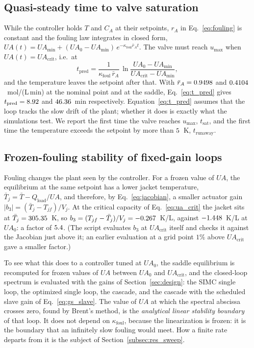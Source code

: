 \subsection{Quasi-steady time to valve saturation}
While the controller holds $T$ and $C_A$ at their setpoints, $r_A$ in Eq.~\eqref{eq:fouling} is constant and the fouling law integrates in closed form, $UA(t)=UA_{\min}+(UA_0-UA_{\min})\,e^{-\kappa_{\mathrm{foul}}\bar r_At}$. The valve must reach $u_{\max}$ when $UA(t)=UA_{\mathrm{crit}}$, i.e.\ at
\begin{equation}
t_{\mathrm{pred}} = \frac{1}{\kappa_{\mathrm{foul}}\,\bar r_A}\,\ln\frac{UA_0-UA_{\min}}{UA_{\mathrm{crit}}-UA_{\min}},
\label{eq:t_pred}
\end{equation}
and the temperature leaves the setpoint after that. With $\bar r_A=0.9498$ and $0.4104$~mol/(L\,min) at the nominal point and at the saddle, Eq.~\eqref{eq:t_pred} gives $t_{\mathrm{pred}}=8.92$ and $46.36$~min respectively. Equation~\eqref{eq:t_pred} assumes that the loop tracks the slow drift of the plant; whether it does is exactly what the simulations test. We report the first time the valve reaches $u_{\max}$, $t_{\mathrm{sat}}$, and the first time the temperature exceeds the setpoint by more than $5$~K, $t_{\mathrm{runaway}}$.

\subsection{Frozen-fouling stability of fixed-gain loops}
\label{subsec:frozen}
Fouling changes the plant seen by the controller. For a frozen value of $UA$, the equilibrium at the same setpoint has a lower jacket temperature, $\bar T_j=\bar T-Q_{\mathrm{load}}/UA$, and therefore, by Eq.~\eqref{eq:jacobian}, a smaller actuator gain $|b_3|=(\bar T_j-T_{jf})/V_j$. At the critical capacity of Eq.~\eqref{eq:ua_crit} the jacket sits at $\bar T_j=305.35$~K, so $b_3=(T_{jf}-\bar T_j)/V_j=-0.267$~K/L, against $-1.448$~K/L at $UA_0$: a factor of $5.4$. (The script evaluates $b_3$ at $UA_{\mathrm{crit}}$ itself and checks it against the Jacobian just above it; an earlier evaluation at a grid point $1\%$ above $UA_{\mathrm{crit}}$ gave a smaller factor.)

To see what this does to a controller tuned at $UA_0$, the saddle equilibrium is recomputed for frozen values of $UA$ between $UA_0$ and $UA_{\mathrm{crit}}$, and the closed-loop spectrum is evaluated with the gains of Section~\ref{sec:design}: the SIMC single loop, the optimized single loop, the cascade, and the cascade with the scheduled slave gain of Eq.~\eqref{eq:gs_slave}. The value of $UA$ at which the spectral abscissa crosses zero, found by Brent's method, is the \emph{analytical linear stability boundary} of that loop. It does not depend on $\kappa_{\mathrm{foul}}$, because the linearization is frozen: it is the boundary that an infinitely slow fouling would meet. How a finite rate departs from it is the subject of Section~\ref{subsec:res_sweep}.

